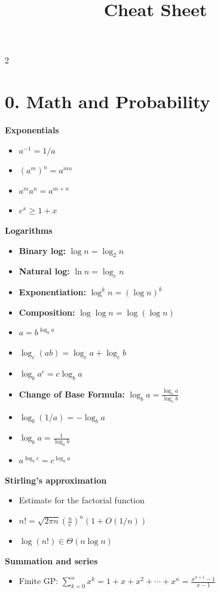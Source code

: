 \documentclass[10pt,landscape]{article}
\title{Cheat Sheet}
\author{}
\date{}
\begin{document}
\begin{multicols*}{2}

\section*{0. Math and Probability}

\textbf{Exponentials}
\begin{itemize}
    \item $a^{-1} = 1/a$
    \item $(a^m)^n = a^{mn}$
    \item $a^m a^n = a^{m+n}$
    \item $e^x \ge 1 + x$
\end{itemize}
\vspace{8pt}
\textbf{Logarithms}
\begin{itemize}
    \item \textbf{Binary log:} $\log n = \log_2 n$
    \item \textbf{Natural log:} $\ln n = \log_e n$
    \item \textbf{Exponentiation:} $\log^k n = (\log n)^k$
    \item \textbf{Composition:} $\log \log n = \log(\log n)$
    \item $a = b^{\log_b a}$
    \item $\log_c (ab) = \log_c a + \log_c b$
    \item $\log_b a^c = c \log_b a$
    \item \textbf{Change of Base Formula:} $\log_b a = \frac{\log_c a}{\log_c b}$
    \item $\log_b (1/a) = -\log_b a$
    \item $\log_b a = \frac{1}{\log_a b}$
    \item $a^{\log_b c} = c^{\log_b a}$
\end{itemize}
\vspace{8pt}
\textbf{Stirling's approximation}
\begin{itemize}
    \item Estimate for the factorial function
    \item $n! = \sqrt{2\pi n} \left(\frac{n}{e}\right)^n (1 + O(1/n))$
    \item $\log(n!) \in \Theta(n \log n)$
\end{itemize}
\vspace{8pt}
\textbf{Summation and series}
\begin{itemize}
    \item Finite GP: $\sum_{k=0}^{n} x^k = 1 + x + x^2 + \cdots + x^n = \frac{x^{n+1} - 1}{x - 1}$

\end{itemize}
\end{multicols*}
\end{document}
